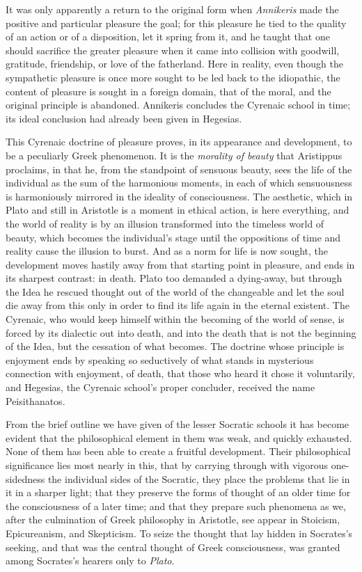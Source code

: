 It was only apparently a return to the original
form when \emph{Annikeris} made the positive and
particular pleasure the goal; for this pleasure he tied to the quality of an
action or of a disposition, let it spring
from it, and he taught that one should sacrifice the greater pleasure when
it came into collision with goodwill, gratitude, friendship,
or love of the fatherland. Here in reality,
even though the sympathetic pleasure is once more sought to be led back to
the idiopathic, the content of pleasure is sought in a foreign domain, that
of the moral, and the original principle is abandoned. Annikeris
concludes the Cyrenaic school in time; its ideal conclusion
had already been given in Hegesias.

This Cyrenaic doctrine of pleasure proves, in its appearance
and development, to be a peculiarly Greek phenomenon. It is
the \emph{morality of beauty} that Aristippus proclaims, in that he, from the standpoint of
sensuous beauty, sees the life of the individual as the sum of the harmonious moments, in each of which sensuousness is harmoniously mirrored in the ideality of consciousness. The
aesthetic, which in Plato and still in Aristotle is a moment in ethical action, is here everything, and the world of reality
is by an illusion transformed into the timeless world
of beauty, which becomes the individual's stage until the oppositions of time and reality cause the illusion to burst. And
as a norm for life is now sought, the development moves hastily
away from that starting point in pleasure, and ends in its sharpest
contrast: in death. Plato too demanded a dying-away, but
through the Idea he rescued thought out of the world of the changeable
and let the soul die away from this only in order to find its life
again in the eternal existent. The Cyrenaic, who would keep himself within
the becoming of the world of sense, is forced by its dialectic out into
death, and into the death that is not the beginning of the Idea, but the
cessation of what becomes. The doctrine whose principle is enjoyment ends
by speaking so seductively of what stands in mysterious connection with enjoyment, of death, that those who heard
it chose it voluntarily, and Hegesias, the Cyrenaic school's
proper concluder, received the name Peisithanatos.

\divrule

From the brief outline we have given of the lesser Socratic schools it has become evident that the philosophical element in
them was weak, and quickly exhausted. None of them has been able
to create a fruitful development. Their philosophical significance lies
most nearly in this, that by carrying through with vigorous one-sidedness
the individual sides of the Socratic, they place the problems that lie in
it in a sharper light; that they preserve the forms of thought of an older time for the consciousness of a later time; and that they prepare
such phenomena as we, after the culmination of Greek philosophy
in Aristotle, see appear in Stoicism, Epicureanism, and Skepticism. To seize the thought that lay
hidden in Socrates's seeking, and that was the central thought of Greek consciousness, was granted among Socrates's hearers only to
\emph{Plato}.


